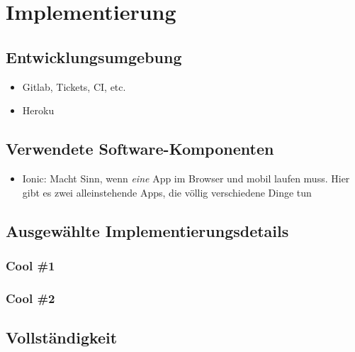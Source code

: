 \chapter{Implementierung}\label{implementierung}

\blindtext[1]

\section{Entwicklungsumgebung}\label{entwicklungsumgebung}

\begin{itemize}
\tightlist
\item
  Gitlab, Tickets, CI, etc.
\item
  Heroku
\end{itemize}

\section{Verwendete
Software-Komponenten}\label{verwendete-software-komponenten}

\begin{itemize}
\tightlist
\item
  Ionic: Macht Sinn, wenn \emph{eine} App im Browser und mobil laufen
  muss. Hier gibt es zwei alleinstehende Apps, die völlig verschiedene
  Dinge tun
\end{itemize}

\section{Ausgewählte
Implementierungsdetails}\label{ausgewuxe4hlte-implementierungsdetails}

\subsection{Cool \#1}\label{cool-1}

\subsection{Cool \#2}\label{cool-2}

\section{Vollständigkeit}\label{vollstuxe4ndigkeit}
